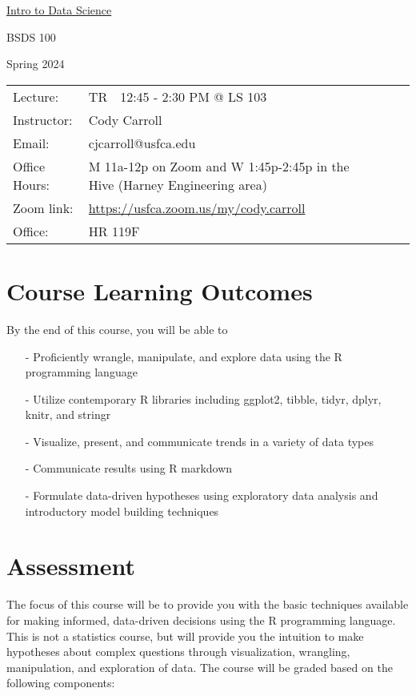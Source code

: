 \documentclass[10pt, oneside]{article}
\begin{document}
	\begin{center} \Large{\underline{Intro to Data Science}} \end{center} 
\begin{center} \Large{BSDS 100} \end{center} 
\begin{center} \Large{Spring 2024} \end{center} 
\begin{table}[ht]
\begin{tabular}{lllll}
 Lecture:&  TR~~12:45  - 2:30  PM @ LS 103	 &   \\ 
 Instructor: & Cody Carroll&  \\
 Email:  & cjcarroll@usfca.edu & \\ 
 Office Hours: & M 11a-12p on  Zoom and W 1:45p-2:45p in the Hive (Harney Engineering area)\\ 
 Zoom link: &  \url{https://usfca.zoom.us/my/cody.carroll}\\
 Office: &  HR 119F\\ 
\end{tabular}
\end{table}

\thispagestyle{empty}
\section*{Course Learning Outcomes}
By the end of this course, you will be able to

\begin{itemize}
	\item[-] Proficiently wrangle, manipulate, and explore data using the R programming language
	\item[-] Utilize contemporary R libraries including ggplot2, tibble, tidyr, dplyr, knitr, and stringr
	\item[-] Visualize, present, and communicate trends in a variety of data types
	\item[-] Communicate results using R markdown 
	\item[-] Formulate data-driven hypotheses using exploratory data analysis and introductory model building techniques
\end{itemize}



\section*{Assessment}
The focus of this course will be to provide you with the basic techniques available for making informed, data-driven decisions using the R programming language. This is not a statistics course, but will provide you the intuition to make hypotheses about complex questions through visualization, wrangling, manipulation, and exploration of data. The course will be graded based on the following components:
\end{document}
